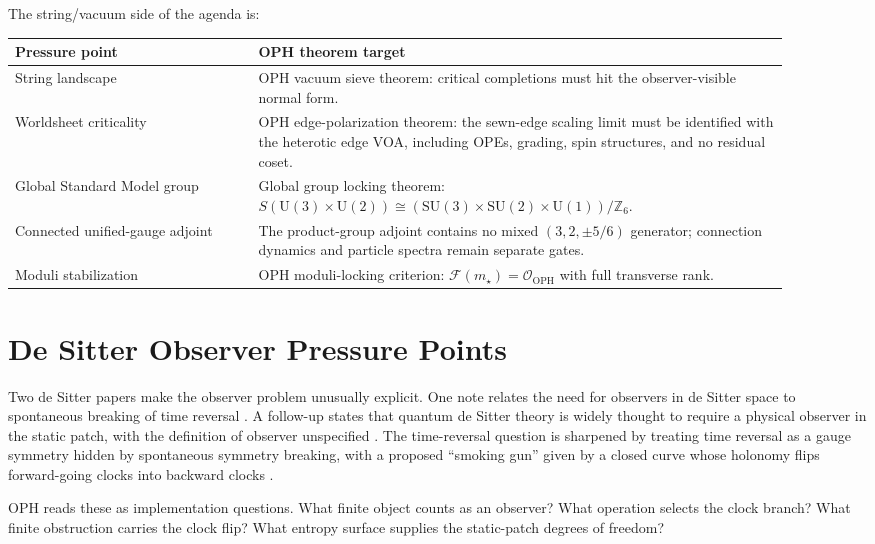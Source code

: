 \documentclass[11pt]{article}
\theoremstyle{remark}
\theoremstyle{plain}
\newcommand{\OPH}{\mathrm{OPH}}
\newcommand{\SU}{\mathrm{SU}}
\newcommand{\U}{\mathrm{U}}
\newcommand{\Z}{\mathbb Z}
\newcommand{\calF}{\mathcal F}
\newcommand{\calO}{\mathcal O}
\begin{document}
The string/vacuum side of the agenda is:
\begin{center}
\small
\begin{tabular}{p{0.29\linewidth}p{0.61\linewidth}}
\toprule
\textbf{Pressure point} & \textbf{OPH theorem target} \\
\midrule
String landscape & OPH vacuum sieve theorem: critical completions must hit the observer-visible
normal form. \\
Worldsheet criticality & OPH edge-polarization theorem: the sewn-edge scaling limit must be
identified with the heterotic edge VOA, including OPEs, grading, spin structures, and no residual
coset. \\
Global Standard Model group & Global group locking theorem:
\(S(\U(3)\times\U(2))\cong(\SU(3)\times\SU(2)\times\U(1))/\Z_6\). \\
Connected unified-gauge adjoint & The product-group adjoint
contains no mixed \((3,2,\pm5/6)\) generator; connection dynamics and particle spectra remain separate gates. \\
Moduli stabilization & OPH moduli-locking criterion:
\(\calF(m_\star)=\calO_{\OPH}\) with full transverse rank. \\
\bottomrule
\end{tabular}
\end{center}

\section{De Sitter Observer Pressure Points}

Two de Sitter papers make the observer problem unusually explicit. One note relates the need
for observers in de Sitter space to spontaneous breaking of time reversal \cite{DSObservers2025}.
A follow-up states that quantum de Sitter theory is widely thought to require a physical observer
in the static patch, with the definition of observer unspecified \cite{DSMoreObservers2026}. The
time-reversal question is sharpened by treating time reversal as a gauge symmetry hidden by
spontaneous symmetry breaking, with a proposed ``smoking gun'' given by a closed curve whose
holonomy flips forward-going clocks into backward clocks \cite{DSTimeReversal2026}.

OPH reads these as implementation questions. What finite object counts as an observer? What
operation selects the clock branch? What finite obstruction carries the clock flip? What entropy
surface supplies the static-patch degrees of freedom?
\end{document}

